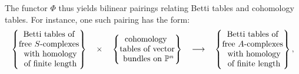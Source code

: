 \documentclass[12pt]{amsart}
\theoremstyle{definition}
\theoremstyle{remark}
\newcommand{\PP}{\mathbb{P}}
\newcommand{\cE}{\mathcal{E}}
\newcommand{\FF}{\mathbf{F}}
\begin{document}
The functor $\Phi$ thus yields bilinear pairings relating Betti tables and cohomology tables.  For instance, one such pairing has the form:
\begin{equation}%
\label{eqn:**}
\begin{tabular}{c c c c c}
$\left\{\begin{matrix}
\text{Betti tables of} \\ \text{free $S$-complexes}\\
\text{ with homology}\\ \text{ of finite length}
\end{matrix}\right\}$
&
$\times$
&
$\left\{\begin{matrix}
\text{cohomology }\\
\text{tables of vector}\\
\text{ bundles on } \PP^n
\end{matrix}\right\}$
&
$\longrightarrow$
&
$\left\{\begin{matrix}
\text{Betti tables of} \\ \text{free $A$-complexes}\\
\text{ with homology}\\ \text{ of finite length}
\end{matrix}\right\},$
\end{tabular}
\end{equation}
\end{document}

